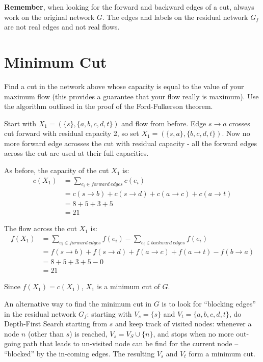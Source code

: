 \documentclass{article}
\begin{document}
{\bf Remember}, 
when looking for the forward and backward edges of a cut, always work on the
original network $G$. 
The edges and labels on the residual network $G_f$ 
are not real edges and not real flows.

\section{Minimum Cut}
Find a cut in the network above whose capacity is equal to the value
of your maximum flow (this provides a guarantee that your flow really
is maximum). Use the algorithm outlined in the proof of the
Ford-Fulkerson theorem.

Start with $X_1 = (\{s\}, \{a,b,c,d,t\})$ and flow from before.
Edge $s \rightarrow a$ crosses cut forward with residual capacity 2, so set
$X_1 = (\{s,a\}, \{b,c,d,t\})$. Now no more forward edge acrosses the cut 
with residual capacity - all the forward edges across the cut are used at
their full capacities.

As before, the capacity of the cut $X_1$ is:
\begin{equation}
	\begin{split}
		c(X_1) &= \sum_{e_i \in forward~edges} c(e_i)\\
		&=c(s \rightarrow b) + c(s \rightarrow d) + 
		c(a\rightarrow c) + c(a \rightarrow t)\\
		&= 8 + 5 + 3 + 5 \\
		&= 21
	\end{split}
\end{equation}

The flow across the cut $X_1$ is:
\begin{equation}
	\begin{split}
		f(X_1) &= \sum_{e_i \in forward~edges} f(e_i)
		- \sum_{e_i \in backward~edges} f(e_i)\\
		&= f(s \rightarrow b) + f(s \rightarrow d) + 
		f(a \rightarrow c) + f(a\rightarrow t) - f(b \rightarrow a)\\
		&=8 + 5 + 3 + 5 -0\\
		&= 21
	\end{split}
\end{equation}

Since $f(X_1) = c(X_1)$, $X_1$ is a minimum cut of $G$.

An alternative way to find the minimum cut in $G$ is to look for ``blocking edges'' in
the residual network $G_f$: starting with 
$V_s = \{s\}$ and $V_t = \{a, b, c, d, t\}$,
do Depth-First Search starting from $s$ and keep track of visited nodes: 
whenever a node $n$ (other than $s$) is reached, $V_s = V_S \cup \{n\}$,
and stops when no more out-going path that leads to un-visited node 
can be find for the current node -- ``blocked'' by the in-coming edges.
The resulting $V_s$ and $V_t$ form a minimum cut.
\end{document}
